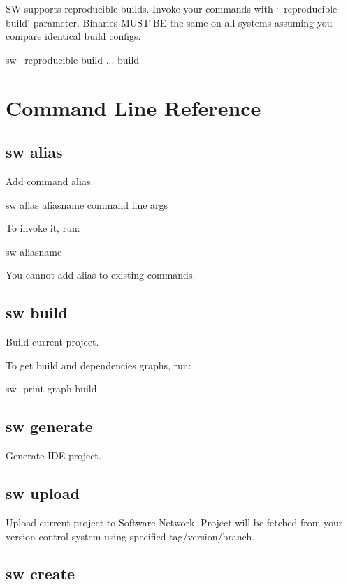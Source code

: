 SW supports reproducible builds.
Invoke your commands with `--reproducible-build` parameter.
Binaries MUST BE the same on all systems assuming you compare identical build configs.

\begin{command}
sw --reproducible-build ... build
\end{command}


\section{Command Line Reference}

\subsection{sw alias}

Add command alias.
\begin{command}
sw alias aliasname command line args
\end{command}

To invoke it, run:
\begin{command}
sw aliasname
\end{command}

You cannot add alias to existing commands.

\subsection{sw build}

Build current project.

To get build and dependencies graphs, run:
\begin{command}
sw -print-graph build
\end{command}

\subsection{sw generate}

Generate IDE project.

\subsection{sw upload}

Upload current project to Software Network.
Project will be fetched from your version control system using specified tag/version/branch.

\subsection{sw create}

